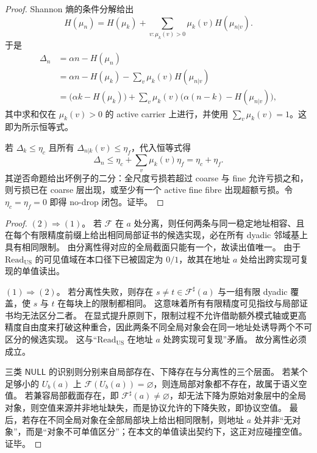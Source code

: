 \begin{proof}
Shannon 熵的条件分解给出
\[
H(\mu_n)=H(\mu_k)+\sum_{v:\mu_k(v)>0}\mu_k(v)H(\mu_{n|v}).
\]
于是
\[
\begin{aligned}
\Delta_n
&=\alpha n-H(\mu_n)\\
&=\alpha n-H(\mu_k)-\sum_v\mu_k(v)H(\mu_{n|v})\\
&=\bigl(\alpha k-H(\mu_k)\bigr)
  +\sum_v\mu_k(v)\bigl(\alpha(n-k)-H(\mu_{n|v})\bigr),
\end{aligned}
\]
其中求和仅在 \(\mu_k(v)>0\) 的 active carrier 上进行，并使用 \(\sum_v\mu_k(v)=1\)。这即为所示恒等式。

若 \(\Delta_k\le\eta_c\) 且所有 \(\Delta_{n|k}(v)\le\eta_f\)，代入恒等式得
\[
\Delta_n\le\eta_c+\sum_v\mu_k(v)\eta_f=\eta_c+\eta_f.
\]
其逆否命题给出坏例子的二分：全尺度亏损若超过 coarse 与 fine 允许亏损之和，则亏损已在 coarse 层出现，或至少有一个 active fine fibre 出现超额亏损。令 \(\eta_c=\eta_f=0\) 即得 no-drop 闭包。证毕。
\end{proof}

\begin{proof}
\((2)\Rightarrow(1)\)。
若 \(\mathscr F\) 在 \(a\) 处分离，则任何两条与同一稳定地址相容、且在每个有限精度前缀上给出相同局部证书的候选实现，必在所有 dyadic 邻域基上具有相同限制。
由分离性得对应的全局截面只能有一个，故读出值唯一。
由于 \(\mathrm{Read}_{\mathrm{US}}\) 的可见值域在本口径下已被固定为 \(0/1\)，故其在地址 \(a\) 处给出跨实现可复现的单值读出。

\((1)\Rightarrow(2)\)。
若分离性失败，则存在 \(s\neq t\in\mathscr F^\sharp(a)\) 与一组有限 dyadic 覆盖，使 \(s\) 与 \(t\) 在每块上的限制都相同。
这意味着所有有限精度可见指纹与局部证书均无法区分二者。
在显式提升原则下，限制过程不允许借助额外模式轴或更高精度自由度来打破这种重合，因此两条不同全局对象会在同一地址处诱导两个不可区分的候选实现。
这与“\(\mathrm{Read}_{\mathrm{US}}\) 在地址 \(a\) 处跨实现可复现”矛盾。
故分离性必须成立。

三类 \(\mathsf{NULL}\) 的识别则分别来自局部存在、下降存在与分离性的三个层面。
若某个足够小的 \(U_b(a)\) 上 \(\mathscr F(U_b(a))=\varnothing\)，则连局部对象都不存在，故属于语义空值。
若兼容局部截面存在，即 \(\mathscr F^\sharp(a)\neq\varnothing\)，却无法下降为原始对象层中的全局对象，则空值来源并非地址缺失，而是协议允许的下降失败，即协议空值。
最后，若存在不同全局对象在全部局部块上给出相同限制，则地址 \(a\) 处并非“无对象”，而是“对象不可单值区分”；在本文的单值读出契约下，这正对应碰撞空值。
证毕。
\end{proof}
